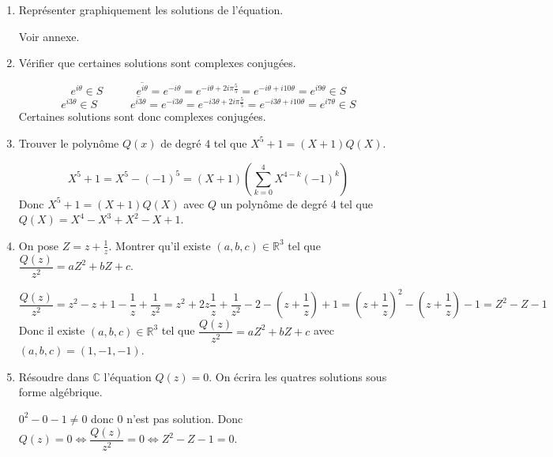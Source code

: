 \documentclass[a4paper,french,bookmarks]{article}
\begin{document}
\begin{enumerate}
    
    \item Représenter graphiquement les solutions de l'équation.
    \begin{tcolorbox}[colback=black!8,colframe=black!9,boxrule=.25pt,enhanced,arc is angular,arc=0pt]
    Voir annexe.
    \end{tcolorbox}
    \item Vérifier que certaines solutions sont complexes conjugées.
        \begin{tcolorbox}[colback=black!8,colframe=black!9,boxrule=.25pt,enhanced,arc is angular,arc=0pt]
    \[e^{i\theta} \in S \quad\qquad \overline{e^{i\theta}} = e^{-i\theta} = e^{-i\theta+2i\pi\frac{5}{5}} = e^{-i\theta + i10\theta} = e^{i9\theta} \in S\]
    \[e^{i3\theta} \in S \quad\qquad \overline{e^{i3\theta}} = e^{-i3\theta} = e^{-i3\theta+2i\pi\frac{5}{5}} = e^{-i3\theta + i10\theta} = e^{i7\theta} \in S\]
    Certaines solutions sont donc complexes conjugées.
    \end{tcolorbox}
    \item Trouver le polynôme $Q(x)$ de degré $4$ tel que $X^5+1=(X+1)Q(X)$.
    \begin{tcolorbox}[colback=black!8,colframe=black!9,boxrule=.25pt,enhanced,arc is angular,arc=0pt]
    $$\displaystyle X^5 + 1 = X^5 - (-1)^5 = (X+1)\left(\sum_{k=0}^4X^{4-k}(-1)^k\right)$$ Donc $X^5 + 1 = (X+1)Q(X)$ avec $Q$ un polynôme de degré 4 tel que $\displaystyle Q(X)=X^4-X^3+X^2-X+1$.
    \end{tcolorbox}
    \item On pose $Z = z + \frac{1}{z}$. Montrer qu'il existe $(a,b,c) \in \mathbb{R}^3$ tel que \quad $\dfrac{Q(z)}{z^2}=aZ^2 + bZ + c$.
    \begin{tcolorbox}[colback=black!8,colframe=black!9,boxrule=.25pt,enhanced,arc is angular,arc=0pt]
    \[\dfrac{Q(z)}{z^2} = z^2-z+1-\dfrac{1}{z}+\dfrac{1}{z^2} = z^2+2z\dfrac{1}{z}+\dfrac{1}{z^2} - 2 -  \left(z + \dfrac{1}{z}\right) + 1 = \left(z+\dfrac{1}{z}\right)^2 - \left(z + \dfrac{1}{z}\right) - 1 = Z^2 - Z - 1\]
    Donc il existe $(a,b,c) \in \mathbb{R}^3$ tel que \quad $\dfrac{Q(z)}{z^2}=aZ^2 + bZ + c$ \quad avec $(a,b,c)=(1,-1,-1)$.
    \end{tcolorbox}
    \item Résoudre dans $\mathbb{C}$ l'équation $Q(z)=0$. On écrira les quatres solutions sous forme algébrique.
    \begin{tcolorbox}[colback=black!8,colframe=black!9,boxrule=.25pt,enhanced,arc is angular,arc=0pt]
    $0^2-0-1\neq0$ donc $0$ n'est pas solution. Donc $Q(z)=0 \iff \dfrac{Q(z)}{z^2}=0 \iff Z^2-Z-1=0$.\\

\end{tcolorbox}
\end{enumerate}
\end{document}
